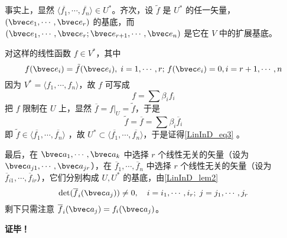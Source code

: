 事实上，显然 $\langle\overline{f_1},\cdots,\overline{f_n}\rangle \in U^*$。齐次，设 $\tilde f$ 是 $U^*$ 的任一矢量，$(\bvec e_1,\cdots,\bvec e_r)$ 的基底，而 $(\bvec e_1,\cdots,\bvec e_r;\bvec e_{r+1},\cdots,\bvec e_n)$ 是它在 $V$ 中的扩展基底。

对这样的线性函数 $f\in V^*$，其中 
\begin{equation}
f(\bvec e_i)=\tilde f(\bvec e_i),\;i=1,\cdots ,r;\, f(\bvec e_i)=0,i=r+1,\cdots,n
\end{equation}
因为 $V^*=\langle f_1,\cdots,f_n\rangle$，故 $f$ 可写成
\begin{equation}
f=\sum \beta_if_i
\end{equation}
把 $f$ 限制在 $U$ 上，显然 $\overline f=f|_U=\tilde f$，于是
\begin{equation}
\tilde f=\overline f=\sum \beta_i \overline f_i
\end{equation}
即 $\tilde f\in\langle\overline{f_1},\cdots,\overline{f_n}\rangle$ ，故 $U^*\subset\langle\overline{f_1},\cdots,\overline{f_n}\rangle$，于是证得\autoref{LinInD_eq3} 。

最后，在 $\bvec a_1,\cdots,\bvec a_k$ 中选择 $r$ 个线性无关的矢量（设为 $\bvec a_{j1},\cdots,\bvec a_{jr} $），在 $\overline f_1,\cdots ,\overline f_n$ 中选择 $r$ 个线性无关的矢量（设为 $\overline f_{i1},\cdots,\overline f_{ir}$），它们分别构成 $U,U^*$ 的基底，由\autoref{LinInD_lem2} 
\begin{equation}
\det(\overline f_i(\bvec a_j))\neq0,\quad i=i_1,\cdots ,i_r;\; j=j_1,\cdots,j_r
\end{equation}
剩下只需注意 $\overline f_i(\bvec a_j)=f_i(\bvec a_j)$。

\textbf{证毕！}
